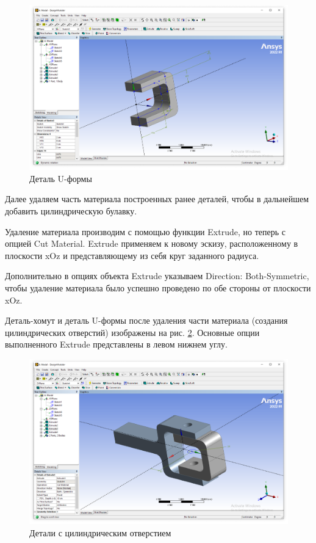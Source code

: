 \begin{figure}[H] 
	\center
	\includegraphics[width=\textwidth]{images/extrude2.png}
	\caption{Деталь U-формы}
	\label{fig:extrude2}
\end{figure}

Далее удаляем часть материала построенных ранее деталей, чтобы в дальнейшем добавить цилиндрическую булавку.

Удаление материала производим с помощью функции Extrude, но теперь с опцией Cut Material. Extrude применяем к новому эскизу, расположенному в плоскости xOz и представляющему из себя круг заданного радиуса.

Дополнительно в опциях объекта Extrude указываем Direction: Both-Symmetric, чтобы удаление материала было успешно проведено по обе стороны от плоскости xOz.

Деталь-хомут и деталь U-формы после удаления части материала (создания цилиндрических отверстий) изображены на рис. \ref{fig:cutmaterial}. Основные опции выполненного Extrude представлены в левом нижнем углу.

\begin{figure}[H] 
	\center
	\includegraphics[width=\textwidth]{images/cutmaterial.png}
	\caption{Детали с цилиндрическим отверстием}
	\label{fig:cutmaterial}
\end{figure}

